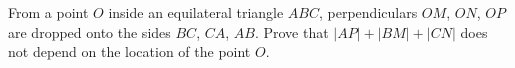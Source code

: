 From a point $O$ inside an equilateral triangle $ABC$, perpendiculars $OM$, $ON$, $OP$ are dropped onto the sides $BC$, $CA$, $AB$. Prove that $|AP| + |BM| + |CN|$ does not depend on the location of the point $O$.
